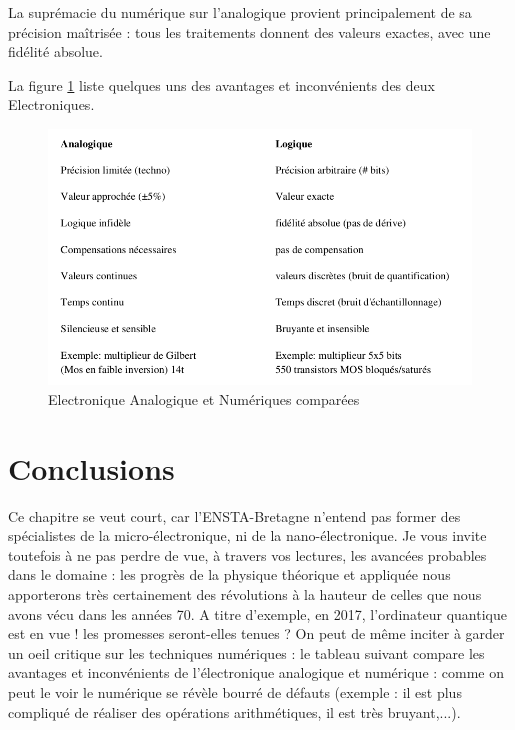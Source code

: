 La suprémacie du numérique sur l'analogique provient principalement de sa précision maîtrisée : tous les traitements donnent des valeurs exactes, avec une fidélité absolue.

La figure \ref{comparaison} liste quelques uns des avantages et inconvénients des deux Electroniques.

  \begin{figure}[htb]
    \begin{center}
    \includegraphics[scale=0.4]{figures/avantages.png}
    \caption{Electronique Analogique et Numériques comparées}
    \label{comparaison}
    \end{center}
  \end{figure}

\section{Conclusions}

Ce chapitre se veut court, car l'ENSTA-Bretagne n'entend pas former des spécialistes de la micro-électronique, ni de la nano-électronique.
Je vous invite toutefois à ne pas perdre de vue, à travers vos lectures, les avancées probables dans le domaine : les progrès de la physique théorique
et appliquée nous apporterons très certainement des révolutions à la hauteur de celles que nous avons vécu dans les années 70. A titre d'exemple, en 2017,
l'ordinateur quantique est en vue ! les promesses seront-elles tenues ?
On peut de même inciter à garder un oeil critique sur les techniques numériques : le tableau suivant compare les avantages et inconvénients de l'électronique
analogique et numérique : comme on peut le voir le numérique se révèle bourré de défauts (exemple : il est plus compliqué de réaliser des opérations arithmétiques,
il est très bruyant,...).
